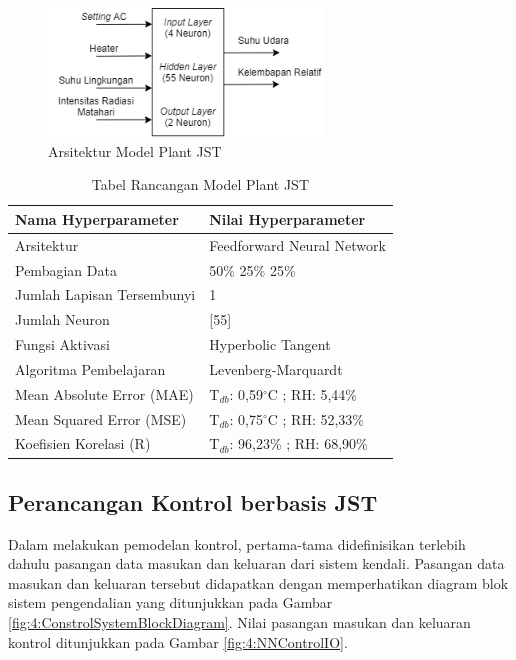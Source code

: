 \begin{figure}[!h]
	\centering
	\includegraphics[width=0.65\textwidth]{figures/NNPlantModelDesign}
	\caption{Arsitektur Model Plant JST}
	\label{fig:4:NNPlantModelDesign}
\end{figure}

\begin{table}[!h]
	\caption{Tabel Rancangan Model Plant JST}
	\label{tbl:5:NNPlantTanto}
	\centering
	\begin{tabular}{|p{5cm}|p{5.2cm}|}
		\hline
		\textbf{Nama Hyperparameter} & \textbf{Nilai Hyperparameter} \\ \hline
		Arsitektur & Feedforward Neural Network \\ \hline
		Pembagian Data & 50\% 25\% 25\% \\ \hline 
		Jumlah Lapisan Tersembunyi & 1 \\ \hline
		Jumlah Neuron & [55] \\ \hline
		Fungsi Aktivasi & Hyperbolic Tangent \\ \hline
		Algoritma Pembelajaran & Levenberg-Marquardt \\ \hline
		Mean Absolute Error (MAE) & T$_{db}$: 0,59$^\circ$C ; RH: 5,44\% \\ \hline
		Mean Squared Error (MSE) & T$_{db}$: 0,75$^\circ$C ; RH: 52,33\% \\ \hline
		Koefisien Korelasi (R) & T$_{db}$: 96,23\% ; RH: 68,90\% \\ \hline
	\end{tabular}
\end{table}


\subsection{Perancangan Kontrol berbasis JST}

Dalam melakukan pemodelan kontrol, pertama-tama didefinisikan terlebih dahulu pasangan data masukan dan keluaran dari sistem kendali. Pasangan data masukan dan keluaran tersebut didapatkan dengan memperhatikan diagram blok sistem pengendalian yang ditunjukkan pada Gambar \ref{fig:4:ConstrolSystemBlockDiagram}. Nilai pasangan masukan dan keluaran kontrol ditunjukkan pada Gambar \ref{fig:4:NNControlIO}.

